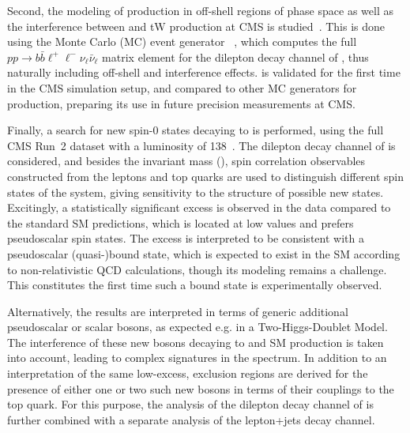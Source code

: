 
Second, the modeling of \ttbar production in off-shell regions of phase space as well as the interference between \ttbar and tW production at CMS is studied~\cite{CMS:NOTE-2023-015}. This is done using the Monte Carlo (MC) event generator \bbfourl~\cite{Jezo:2016ujg}, which computes the full $p p \rightarrow b \bar{b} \ell^+ \ell^- \nu_{\ell} \bar{\nu}_{\ell}$ matrix element for the dilepton decay channel of \ttbar, thus naturally including off-shell and interference effects. \bbfourl is validated for the first time in the CMS simulation setup, and compared to other MC generators for \ttbar production, preparing its use in future precision \ttbar measurements at CMS.


Finally, a search for new spin-0 states decaying to \ttbar is performed, using the full CMS Run~2 dataset with a luminosity of \SI{138}{\fbinv}~\cite{CMS:HIG-22-013-PAS,CMS:TOP-24-007}. The dilepton decay channel of \ttbar is considered, and besides the invariant \ttbar mass (\mtt), spin correlation observables constructed from the leptons and top quarks are used to distinguish different spin states of the \ttbar system, giving sensitivity to the \CP structure of possible new states. Excitingly, a statistically significant excess is observed in the data compared to the standard SM predictions, which is located at low \mtt values and prefers pseudoscalar spin states. The excess is interpreted to be consistent with a pseudoscalar \ttbar (quasi-)bound state, which is expected to exist in the SM according to non-relativistic QCD calculations, though its modeling remains a challenge. This constitutes the first time such a \ttbar bound state is experimentally observed.

Alternatively, the results are interpreted in terms of generic additional pseudoscalar or scalar bosons, as expected e.g. in a Two-Higgs-Doublet Model. The interference of these new bosons decaying to \ttbar and SM \ttbar production is taken into account, leading to complex signatures in the \mtt spectrum. In addition to an interpretation of the same low-\mtt excess, exclusion regions are derived for the presence of either one or two such new bosons in terms of their couplings to the top quark. For this purpose, the analysis of the dilepton decay channel of \ttbar is further combined with a separate analysis of the lepton+jets decay channel.

